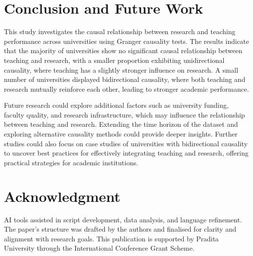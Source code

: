 \documentclass[a4paper, conference]{IEEEtran}
\begin{document}
\section{Conclusion and Future Work}
\label{sec:conclusion_and_future_work}

This study investigates the causal relationship between research and teaching performance across universities using Granger causality tests. The results indicate that the majority of universities show no significant causal relationship between teaching and research, with a smaller proportion exhibiting unidirectional causality, where teaching has a slightly stronger influence on research. A small number of universities displayed bidirectional causality, where both teaching and research mutually reinforce each other, leading to stronger academic performance.

Future research could explore additional factors such as university funding, faculty quality, and research infrastructure, which may influence the relationship between teaching and research. Extending the time horizon of the dataset and exploring alternative causality methods could provide deeper insights. Further studies could also focus on case studies of universities with bidirectional causality to uncover best practices for effectively integrating teaching and research, offering practical strategies for academic institutions.


\section*{Acknowledgment}
AI tools assisted in script development, data analysis, and language refinement. The paper’s structure was drafted by the authors and finalised for clarity and alignment with research goals. This publication is supported by Pradita University through the International Conference Grant Scheme.




\end{document}
